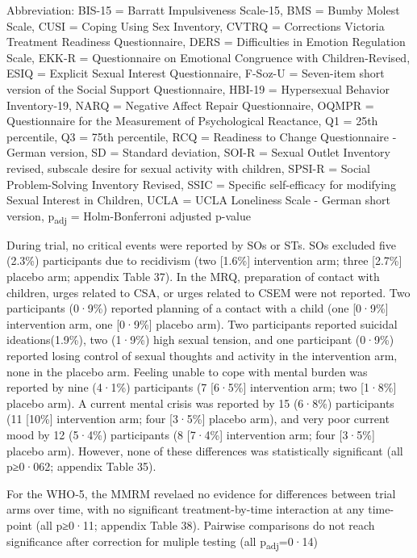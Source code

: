 \documentclass[
  super,
  preprint,
  1p,
  onecolumn]{elsarticle}
\begin{document}
\begin{table}
{\begin{minipage}{\linewidth}
\parbox{\linewidth}{\raggedright {Abbreviation: BIS-15 = Barratt Impulsiveness Scale-15, BMS = Bumby Molest Scale, CUSI = Coping Using Sex Inventory, CVTRQ = Corrections Victoria Treatment Readiness Questionnaire, DERS = Difficulties in Emotion Regulation Scale, EKK-R = Questionnaire on Emotional Congruence with Children-Revised, ESIQ = Explicit Sexual Interest Questionnaire, F-Soz-U = Seven-item short version of the Social Support Questionnaire, HBI-19 = Hypersexual Behavior Inventory-19, NARQ = Negative Affect Repair Questionnaire, OQMPR = Questionnaire for the Measurement of Psychological Reactance, Q1 = 25th percentile, Q3 = 75th percentile, RCQ = Readiness to Change Questionnaire - German version, SD = Standard deviation, SOI-R = Sexual Outlet Inventory revised, subscale desire for sexual activity with children, SPSI-R = Social Problem-Solving Inventory Revised, SSIC = Specific self-efficacy for modifying Sexual Interest in Children, UCLA = UCLA Loneliness Scale - German short version, p\textsubscript{adj} = Holm-Bonferroni adjusted p-value\\
}}\end{minipage}

}

\end{table}%

\newpage{}

During trial, no critical events were reported by SOs or STs. SOs
excluded five (2.3\%) participants due to recidivism (two {[}1.6\%{]}
intervention arm; three {[}2.7\%{]} placebo arm; appendix Table 37). In
the MRQ, preparation of contact with children, urges related to CSA, or
urges related to CSEM were not reported. Two participants (0·9\%)
reported planning of a contact with a child (one {[}0·9\%{]}
intervention arm, one {[}0·9\%{]} placebo arm). Two participants
reported suicidal ideations(1.9\%), two (1·9\%) high sexual tension, and
one participant (0·9\%) reported losing control of sexual thoughts and
activity in the intervention arm, none in the placebo arm. Feeling
unable to cope with mental burden was reported by nine (4·1\%)
participants (7 {[}6·5\%{]} intervention arm; two {[}1·8\%{]} placebo
arm). A current mental crisis was reported by 15 (6·8\%) participants
(11 {[}10\%{]} intervention arm; four {[}3·5\%{]} placebo arm), and very
poor current mood by 12 (5·4\%) participants (8 {[}7·4\%{]} intervention
arm; four {[}3·5\%{]} placebo arm). However, none of these differences
was statistically significant (all p≥0·062; appendix Table 35).

For the WHO‑5, the MMRM revelaed no evidence for differences between
trial arms over time, with no significant treatment-by-time interaction
at any time-point (all p≥0·11; appendix Table 38). Pairwise comparisons
do not reach significance after correction for muliple testing (all
p\textsubscript{adj}=0·14)
\end{document}
